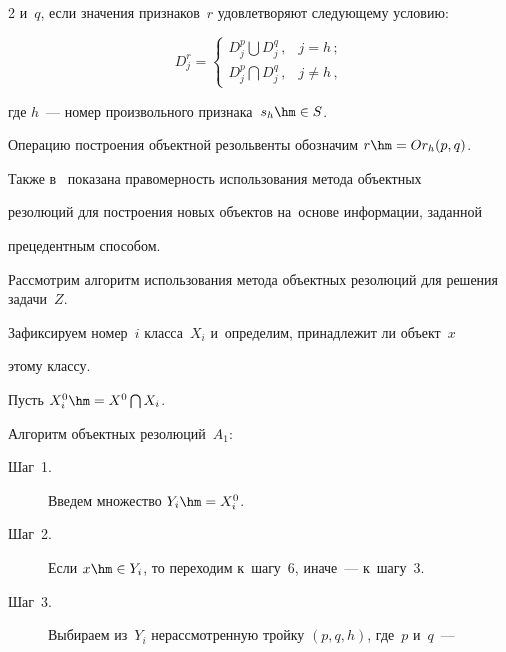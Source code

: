 \begin{multicols}{2}
и~$q$, если значения признаков~$r$ удовлетворяют следующему условию:


$$


 D_{j}^{r}= \begin{cases}


D_{j}^{p} \bigcup D_{j}^{q}\,, & j=h\,; \\


D_{j}^{p} \bigcap D_{j}^{q}\,, & j \neq h\,,


\end{cases}


$$


где $h$~--- номер произвольного признака~$ s_{h}\hm\in S $.





Операцию построения объектной резольвенты обозначим $r\hm=Or_{h}(p,q) $.





Также в~\cite{patrec} показана правомерность использования метода объектных 


резолюций для построения новых объектов на~основе информации, заданной 


прецедентным способом.





Рассмотрим алгоритм использования метода объектных резолюций для решения задачи~$Z$.


Зафиксируем номер~$i$ класса~$X_{i}$ и~определим, принадлежит ли объект~$x$ 


этому классу.


Пусть $ X_{i}^{0}\hm=X^{0} \bigcap X_{i} $.





Алгоритм объектных резолюций~$A_{1} $:


\begin{description}


\item[Шаг~1.] Введем множество $Y_{i}\hm=X_{i}^{0} $.





\item[Шаг~2.] Если $ x \hm\in Y_{i} $, то переходим к~шагу~6, иначе~--- к~шагу~3.





\item[Шаг~3.] Выбираем из~$Y_{i}$ нерассмотренную тройку $(p,q,h) $, где~$p$ и~$q$~--- 



\end{description}
\end{multicols}
